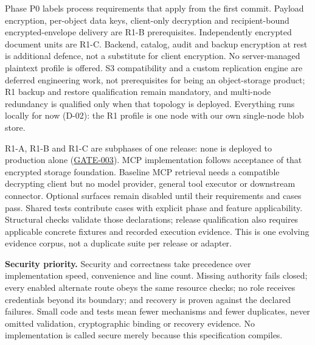 \documentclass[11pt,a4paper]{article}
\newcommand{\rr}[1]{\hyperlink{req:#1}{#1}}
\begin{document}
Phase P0 labels process requirements that apply from the first commit. Payload encryption, per-object data keys, client-only decryption and recipient-bound encrypted-envelope delivery are R1-B prerequisites. Independently encrypted document units are R1-C. Backend, catalog, audit and backup encryption at rest is additional defence, not a substitute for client encryption. No server-managed plaintext profile is offered. S3 compatibility and a custom replication engine are deferred engineering work, not prerequisites for being an object-storage product; R1 backup and restore qualification remain mandatory, and multi-node redundancy is qualified only when that topology is deployed. Everything runs locally for now (D-02): the R1 profile is one node with our own single-node blob store.

R1-A, R1-B and R1-C are subphases of one release: none is deployed to production alone (\rr{GATE-003}). MCP implementation follows acceptance of that encrypted storage foundation. Baseline MCP retrieval needs a compatible decrypting client but no model provider, general tool executor or downstream connector. Optional surfaces remain disabled until their requirements and cases pass. Shared tests contribute cases with explicit phase and feature applicability. Structural checks validate those declarations; release qualification also requires applicable concrete fixtures and recorded execution evidence. This is one evolving evidence corpus, not a duplicate suite per release or adapter.

\textbf{Security priority.} Security and correctness take precedence over implementation speed, convenience and line count. Missing authority fails closed; every enabled alternate route obeys the same resource checks; no role receives credentials beyond its boundary; and recovery is proven against the declared failures. Small code and tests mean fewer mechanisms and fewer duplicates, never omitted validation, cryptographic binding or recovery evidence. No implementation is called secure merely because this specification compiles.
\end{document}
